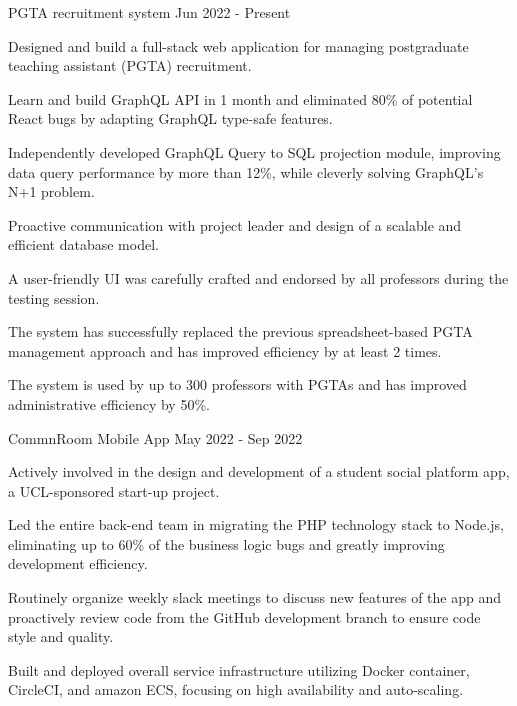 \begin{cventries}
  \cventry
    {}
    {PGTA recruitment system}{}
    {Jun 2022 - Present}
    {
      \begin{cvitems}
        \item {Designed and build a full-stack web application for managing postgraduate teaching assistant (PGTA) recruitment.}
        \item {Learn and build GraphQL API in 1 month and eliminated 80\% of potential React bugs by adapting GraphQL type-safe features.}
        \item {Independently developed GraphQL Query to SQL projection module, improving data query performance by more than 12\%, while cleverly solving GraphQL's N+1 problem.}
        \item {Proactive communication with project leader and design of a scalable and efficient database model.}
        \item {A user-friendly UI was carefully crafted and endorsed by all professors during the testing session.}
        \item {The system has successfully replaced the previous spreadsheet-based PGTA management approach and has improved efficiency by at least 2 times.}
        \item {The system is used by up to 300 professors with PGTAs and has improved administrative efficiency by 50\%.}
      \end{cvitems}
    }

  \cventry
    {}
    {CommnRoom Mobile App}
    {}
    {May 2022 - Sep 2022}
    {
      \begin{cvitems}
        \item {Actively involved in the design and development of a student social platform app, a UCL-sponsored start-up project.}
        \item {Led the entire back-end team in migrating the PHP technology stack to Node.js, eliminating up to 60\% of the business logic bugs and greatly improving development efficiency.}
        \item {Routinely organize weekly slack meetings to discuss new features of the app and proactively review code from the GitHub development branch to ensure code style and quality.}
        \item {Built and deployed overall service infrastructure utilizing Docker container, CircleCI, and amazon ECS, focusing on high availability and auto-scaling.}
      \end{cvitems}
    }


\end{cventries}

